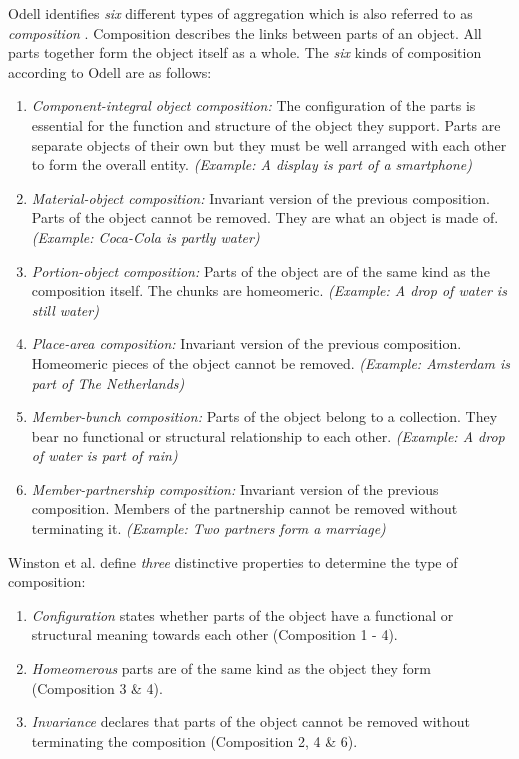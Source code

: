 Odell identifies \textit{six} different types of aggregation which is also referred to as \textit{composition} \cite{Odell1994b}.
Composition describes the links between parts of an object.
All parts together form the object itself as a whole.
The \textit{six} kinds of composition according to Odell \cite{Odell1994b} are as follows:
\begin{enumerate}
\item \textit{Component-integral object composition:} The configuration of the parts is essential for the function and structure of the object they support. Parts are separate objects of their own but they must be well arranged with each other to form the overall entity. \textit{(Example: A display is part of a smartphone)}
\item \textit{Material-object composition:} Invariant version of the previous composition. Parts of the object cannot be removed. They are what an object is made of. \textit{(Example: Coca-Cola is partly water)}
\item \textit{Portion-object composition:} Parts of the object are of the same kind as the composition itself. The chunks are homeomeric. \textit{(Example: A drop of water is still water)}
\item \textit{Place-area composition:} Invariant version of the previous composition. Homeomeric pieces of the object cannot be removed. \textit{(Example: Amsterdam is part of The Netherlands)}
\item \textit{Member-bunch composition:} Parts of the object belong to a collection. They bear no functional or structural relationship to each other. \textit{(Example: A drop of water is part of rain)}
\item \textit{Member-partnership composition:} Invariant version of the previous composition. Members of the partnership cannot be removed without terminating it. \textit{(Example: Two partners form a marriage)}
\end{enumerate}
Winston et al. \cite{Winston1987a} define \textit{three} distinctive properties to determine the type of composition:
\begin{enumerate}
\item \textit{Configuration} states whether parts of the object have a functional or structural meaning towards each other (Composition 1 - 4).
\item \textit{Homeomerous} parts are of the same kind as the object they form (Composition 3 \& 4).
\item \textit{Invariance} declares that parts of the object cannot be removed without terminating the composition (Composition 2, 4 \& 6).
\end{enumerate}

